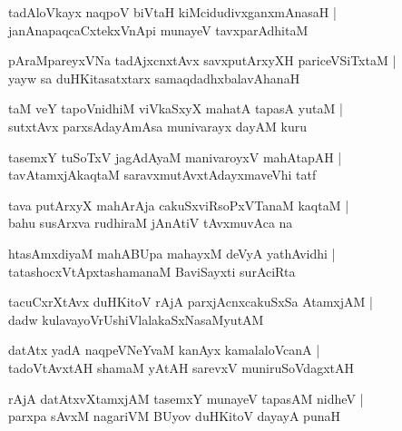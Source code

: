 \documentclass[twoside,12pt,openright]{book}
\newcounter{shloka}[chapter]
\begin{document}
\begin{shloka}%
tadAloVkayx naqpoV biVtaH kiMcidudivxganxmAnasaH |\\
janAnapaqcaCxtekxVnApi munayeV tavxparAdhitaM
\end{shloka}

\begin{shloka}%
pAraMpareyxVNa tadAjxcnxtAvx savxputArxyXH pariceVSiTxtaM |\\
yayw sa duHKitasatxtarx samaqdadhxbalavAhanaH  
\end{shloka}

\begin{shloka}%
taM veY tapoVnidhiM viVkaSxyX mahatA tapasA yutaM |\\
sutxtAvx parxsAdayAmAsa munivarayx dayAM kuru
\end{shloka}

\begin{shloka}%
tasemxY tuSoTxV jagAdAyaM manivaroyxV mahAtapAH |\\
tavAtamxjAkaqtaM saravxmutAvxtAdayxmaveVhi tatf 
\end{shloka}

\begin{shloka}%
tava putArxyX mahArAja cakuSxviRsoPxVTanaM kaqtaM |\\
bahu susArxva rudhiraM jAnAtiV tAvxmuvAca na 
\end{shloka}

\begin{shloka}%
htasAmxdiyaM mahABUpa mahayxM deVyA yathAvidhi |\\
tatashocxVtApxtashamanaM BaviSayxti surAciRta
\end{shloka}

\begin{shloka}%
tacuCxrXtAvx duHKitoV rAjA parxjAcnxcakuSxSa AtamxjAM |\\
dadw kulavayoVrUshiVlalakaSxNasaMyutAM 
\end{shloka}

\begin{shloka}%
datAtx yadA naqpeVNeYvaM kanAyx kamalaloVcanA |\\
tadoVtAvxtAH shamaM yAtAH sarevxV muniruSoVdagxtAH 
\end{shloka}

\begin{shloka}%
rAjA datAtxvXtamxjAM tasemxY munayeV tapasAM nidheV |\\
parxpa sAvxM nagariVM BUyov duHKitoV dayayA punaH 
\end{shloka}
\end{document}
